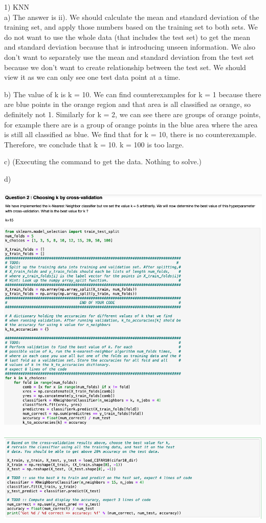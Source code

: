\documentclass[11pt]{article}
\begin{document}
1) KNN \\
a) The answer is ii). We should calculate the mean and standard deviation of the training set, and apply those numbers based on the training set to both sets. We do not want to use the whole data (that includes the test set) to get the mean and standard deviation because that is introducing unseen information. We also don't want to separately use the mean and standard deviation from the test set because we don't want to create relationship between the test set. We should view it as we can only see one test data point at a time.

b) The value of k is k = 10. We can find counterexamples for k = 1 because there are blue points in the orange region and that area is all classified as orange, so definitely not 1. Similarly for k = 2, we can see there are groups of orange points, for example there are is a group of orange points in the blue area where the area is still all classified as blue. We find that for k = 10, there is no counterexample. Therefore, we conclude that k = 10. k = 100 is too large. 

c) (Executing the command to get the data. Nothing to solve.)

d) \\ \\
\includegraphics[scale=0.33]{knn1} \\ \\
\includegraphics[scale=0.33]{knn2}
\end{document}
